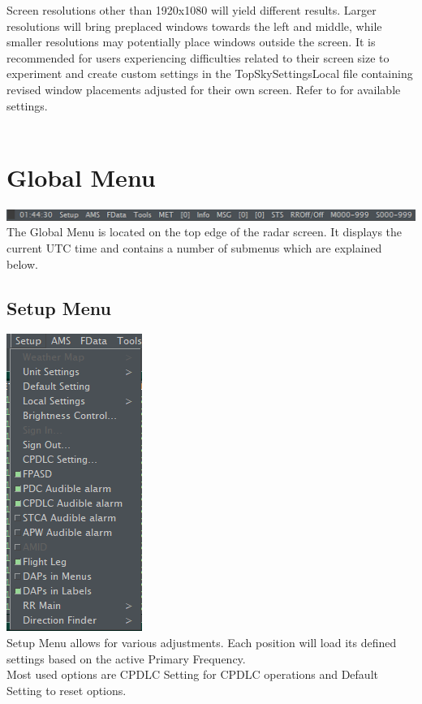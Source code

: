 \documentclass[11pt,a4paper,oldfontcommands]{memoir}
\begin{document}
Screen resolutions other than 1920x1080 will yield different results. Larger resolutions will bring preplaced windows towards the left and middle, while smaller resolutions may potentially place windows outside the screen. It is recommended for users experiencing difficulties related to their screen size to experiment and create custom settings in the TopSkySettingsLocal file containing revised window placements adjusted for their own screen. Refer to \texttt{} for available settings.\\\\

\section{Global Menu}
\includegraphics{img/globalmenu.png}\\
The Global Menu is located on the top edge of the radar screen. It displays the current UTC time and contains a number of submenus which are explained below.

\subsection{Setup Menu}
\includegraphics{img/Setup.png}\\
Setup Menu allows for various adjustments. Each position will load its defined settings based on the active Primary Frequency.\\ 
Most used options are CPDLC Setting for CPDLC operations and Default Setting to reset options.\\
\end{document}
